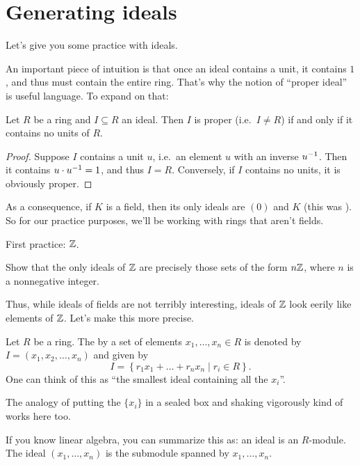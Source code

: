 \section{Generating ideals}

Let's give you some practice with ideals.

An important piece of intuition is that once an ideal
contains a unit, it contains $1$, and
thus must contain the entire ring.
That's why the notion of ``proper ideal''
is useful language.
To expand on that:
\begin{proposition}
	Let $R$ be a ring and $I \subseteq R$ an ideal.
	Then $I$ is proper (i.e.\ $I \ne R$)
	if and only if it contains no units of $R$.
\end{proposition}
\begin{proof}
	Suppose $I$ contains a unit $u$, i.e.\ an element $u$
	with an inverse $u^{-1}$.
	Then it contains $u \cdot u^{-1} = 1$, and thus $I = R$.
	Conversely, if $I$ contains no units, it is obviously proper.
\end{proof}
As a consequence, if $K$ is a field,
then its only ideals are $(0)$ and $K$
(this was ).
So for our practice purposes, we'll be working with rings that aren't fields.

First practice: $\mathbb Z$.
\begin{exercise}
	Show that the only ideals of $\mathbb Z$ are precisely those
	sets of the form $n\mathbb Z$, where $n$ is a nonnegative integer.
\end{exercise}

Thus, while ideals of fields are not terribly interesting,
ideals of $\mathbb Z$ look eerily like elements of $\mathbb Z$.
Let's make this more precise.
\begin{definition}
	Let $R$ be a ring.
	The  by a set of elements $x_1, \dots, x_n \in R$
	is denoted by $I = (x_1, x_2, \dots, x_n)$
	and given by
	\[ I = \left\{ r_1 x_1 + \dots + r_n x_n \mid r_i \in R \right\}.  \]
	One can think of this as ``the smallest ideal containing all the $x_i$''.
\end{definition}

The analogy of putting the $\{x_i\}$ in a sealed box and shaking vigorously
kind of works here too.
\begin{remark}
	If you know linear algebra,
	you can summarize this as: an ideal is an $R$-module.
	The ideal $(x_1, \dots, x_n)$ is the submodule spanned by $x_1, \dots, x_n$.
\end{remark}

